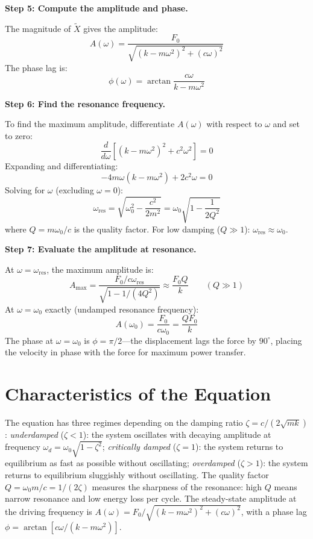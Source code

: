 \documentclass[11pt,openright]{book}
\begin{document}
\textbf{Step 5: Compute the amplitude and phase.}

The magnitude of $\tilde{X}$ gives the amplitude:
\begin{equation}
A(\omega) = \frac{F_0}{\sqrt{(k - m\omega^2)^2 + (c\omega)^2}}
\end{equation}
The phase lag is:
\begin{equation}
\phi(\omega) = \arctan\frac{c\omega}{k - m\omega^2}
\end{equation}

\textbf{Step 6: Find the resonance frequency.}

To find the maximum amplitude, differentiate $A(\omega)$ with respect to $\omega$ and set to zero:
\begin{equation}
\frac{d}{d\omega}\left[(k - m\omega^2)^2 + c^2\omega^2\right] = 0
\end{equation}
Expanding and differentiating:
\begin{equation}
-4m\omega(k - m\omega^2) + 2c^2\omega = 0
\end{equation}
Solving for $\omega$ (excluding $\omega = 0$):
\begin{equation}
\omega_{\text{res}} = \sqrt{\omega_0^2 - \frac{c^2}{2m^2}} = \omega_0\sqrt{1 - \frac{1}{2Q^2}}
\end{equation}
where $Q = m\omega_0/c$ is the quality factor. For low damping ($Q \gg 1$): $\omega_{\text{res}} \approx \omega_0$.

\textbf{Step 7: Evaluate the amplitude at resonance.}

At $\omega = \omega_{\text{res}}$, the maximum amplitude is:
\begin{equation}
A_{\text{max}} = \frac{F_0/c\omega_{\text{res}}}{\sqrt{1 - 1/(4Q^2)}} \approx \frac{F_0 Q}{k} \qquad (Q \gg 1)
\end{equation}
At $\omega = \omega_0$ exactly (undamped resonance frequency):
\begin{equation}
A(\omega_0) = \frac{F_0}{c\omega_0} = \frac{QF_0}{k}
\end{equation}
The phase at $\omega = \omega_0$ is $\phi = \pi/2$---the displacement lags the force by $90^\circ$, placing the velocity in phase with the force for maximum power transfer.

\section*{Characteristics of the Equation}

The equation has three regimes depending on the damping ratio $\zeta = c/(2\sqrt{mk})$: \textit{underdamped} ($\zeta < 1$): the system oscillates with decaying amplitude at frequency $\omega_d = \omega_0\sqrt{1-\zeta^2}$; \textit{critically damped} ($\zeta = 1$): the system returns to equilibrium as fast as possible without oscillating; \textit{overdamped} ($\zeta > 1$): the system returns to equilibrium sluggishly without oscillating. The quality factor $Q = \omega_0 m/c = 1/(2\zeta)$ measures the sharpness of the resonance: high $Q$ means narrow resonance and low energy loss per cycle. The steady-state amplitude at the driving frequency is $A(\omega) = F_0/\sqrt{(k - m\omega^2)^2 + (c\omega)^2}$, with a phase lag $\phi = \arctan[c\omega/(k - m\omega^2)]$.
\end{document}
